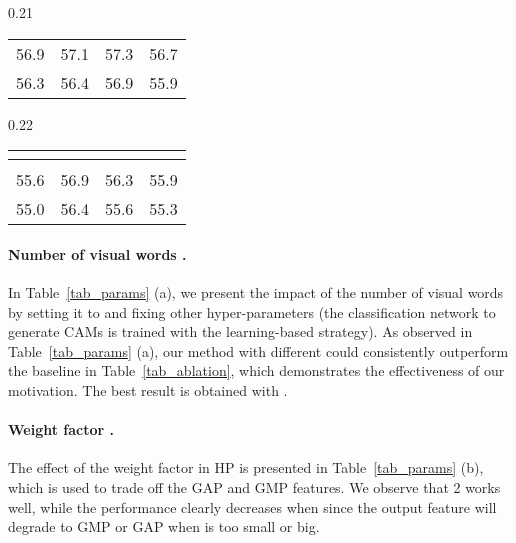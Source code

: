 \begin{table*}[htp]
\begin{subtable}{0.21\textwidth}
\begin{tabular}{llll}
      56.9                    & 57.1                    & 57.3                    & 56.7                    \\
      56.3                    & 56.4                    & 56.9                    & 55.9                    \\ \bottomrule
    \end{tabular}
    \caption{Temperature parameter.}
  \end{subtable}
  \begin{subtable}{0.22\textwidth}
    \setlength{\tabcolsep}{4pt}
    \begin{tabular}{llll}
      \toprule
      \multicolumn{4}{c}{}                                                                                                    \\ \midrule
      \multicolumn{1}{c}{} & \multicolumn{1}{c}{} & \multicolumn{1}{c}{} & \multicolumn{1}{c}{} \\ \midrule
      55.6                          & 56.9                          & 56.3                          & 55.9                          \\
      55.0                          & 56.4                          & 55.6                          & 55.3                          \\ \bottomrule
    \end{tabular}
    \caption{Momentum coefficient.}
  \end{subtable}
\end{table*}


\paragraph{\textbf{Number of visual words .}}
\par In Table~\ref{tab_params} (a), we present the impact of the number of visual words  by setting it to  and fixing other hyper-parameters (the classification network to generate CAMs is trained with the learning-based strategy). As observed in Table~\ref{tab_params} (a), our method with different  could consistently outperform the baseline in Table~\ref{tab_ablation}, which demonstrates the effectiveness of our motivation. The best result is obtained with .

\paragraph{\textbf{Weight factor .}}
\par The effect of the weight factor  in HP is presented in Table~\ref{tab_params} (b), which is used to trade off the GAP and GMP features. We observe that  2 works well, while the performance clearly decreases when  since the output feature will degrade to GMP or GAP when  is too small or big.

